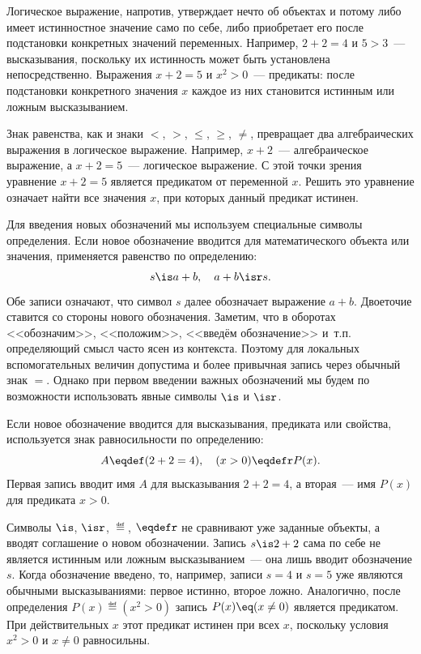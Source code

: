 Логическое выражение, напротив, утверждает нечто об объектах и потому либо имеет истинностное значение само по себе, либо приобретает его после подстановки конкретных значений переменных.
Например, $2 + 2 = 4$ и $5 > 3$~--- высказывания, поскольку их истинность может быть установлена непосредственно.
Выражения $x + 2 = 5$ и $x^2 > 0$~--- предикаты: после подстановки конкретного значения $x$ каждое из них становится истинным или ложным высказыванием.

Знак равенства, как и знаки $<$, $>$, $\le$, $\ge$, $\ne$, превращает два алгебраических выражения в логическое выражение.
Например, $x + 2$~--- алгебраическое выражение, а $x + 2 = 5$~--- логическое выражение.
С этой точки зрения уравнение $x + 2 = 5$ является предикатом от переменной $x$.
Решить это уравнение означает найти все значения $x$, при которых данный предикат истинен.

Для введения новых обозначений мы используем специальные символы определения.
Если новое обозначение вводится для математического объекта или значения, применяется равенство по определению:
\begin{equation*}
    s \is a + b,
    \quad
    a + b \isr s.
\end{equation*}
Обе записи означают, что символ $s$ далее обозначает выражение $a + b$.
Двоеточие ставится со стороны нового обозначения.
Заметим, что в оборотах <<обозначим>>, <<положим>>, <<введём обозначение>> и~т.п. определяющий смысл часто ясен из контекста.
Поэтому для локальных вспомогательных величин допустима и более привычная запись через обычный знак $=$.
Однако при первом введении важных обозначений мы будем по возможности использовать явные символы $\is$ и $\isr$.

Если новое обозначение вводится для высказывания, предиката или свойства, используется знак равносильности по определению:
\begin{equation*}
    A \eqdef (2 + 2 = 4),
    \quad
    (x > 0) \eqdefr P(x).
\end{equation*}
Первая запись вводит имя $A$ для высказывания $2 + 2 = 4$, а вторая~--- имя $P(x)$ для предиката $x > 0$.

Символы $\is$, $\isr$, $\eqdef$, $\eqdefr$ не сравнивают уже заданные объекты, а вводят соглашение о новом обозначении.
Запись $s \is 2 + 2$ сама по себе не является истинным или ложным высказыванием~--- она лишь вводит обозначение $s$.
Когда обозначение введено, то, например, записи $s = 4$ и $s = 5$ уже являются обычными высказываниями: первое истинно, второе ложно.
Аналогично, после определения $P(x) \eqdef (x^2 > 0)$ запись $P(x) \eq (x \ne 0)$ является предикатом.
При действительных $x$ этот предикат истинен при всех $x$, поскольку условия $x^2 > 0$ и $x \ne 0$ равносильны.

